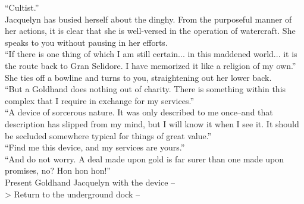 “Cultist.”\\

Jacquelyn has busied herself about the dinghy. From the purposeful manner of her actions, it is clear that she is well-versed in the operation of watercraft. She speaks to you without pausing in her efforts.\\

“If there is one thing of which I am still certain... in this maddened world... it is the route back to Gran Selidore. I have memorized it like a religion of my own.”\\

She ties off a bowline and turns to you, straightening out her lower back.\\

“But a Goldhand does nothing out of charity. There is something within this complex that I require in exchange for my services.”\\

“A device of sorcerous nature. It was only described to me once--and that description has slipped from my mind, but I will know it when I see it. It should be secluded somewhere typical for things of great value.”\\

“Find me this device, and my services are yours.”\\

“And do not worry. A deal made upon gold is far surer than one made upon promises, no? Hon hon hon!”\\

 Present Goldhand Jacquelyn with the device -- \\
> Return to the underground dock -- 